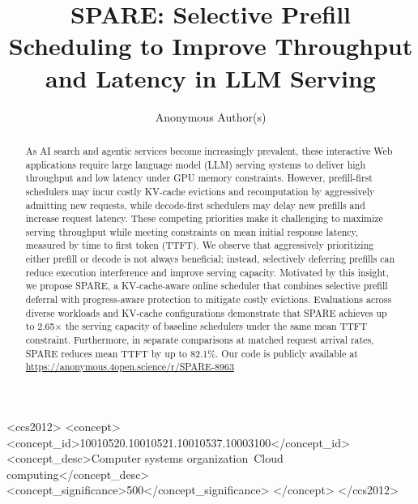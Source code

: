 \documentclass[sigconf,anonymous,review]{acmart}
\begin{document}
\title{SPARE: Selective Prefill Scheduling to Improve Throughput and Latency in LLM Serving}

\author{Anonymous Author(s)}

\begin{abstract}
As AI search and agentic services become increasingly prevalent, these interactive Web applications require large language model (LLM) serving systems to deliver high throughput and low latency under GPU memory constraints. However, prefill-first schedulers may incur costly KV-cache evictions and recomputation by aggressively admitting new requests, while decode-first schedulers may delay new prefills and increase request latency. These competing priorities make it challenging to maximize serving throughput while meeting constraints on mean initial response latency, measured by time to first token (TTFT). We observe that aggressively prioritizing either prefill or decode is not always beneficial; instead, selectively deferring prefills can reduce execution interference and improve serving capacity. Motivated by this insight, we propose SPARE, a KV-cache-aware online scheduler that combines selective prefill deferral with progress-aware protection to mitigate costly evictions. Evaluations across diverse workloads and KV-cache configurations demonstrate that SPARE achieves up to 2.65$\times$ the serving capacity of baseline schedulers under the same mean TTFT constraint. Furthermore, in separate comparisons at matched request arrival rates, SPARE reduces mean TTFT by up to 82.1\%. Our code is publicly available at \url{https://anonymous.4open.science/r/SPARE-8963}
\end{abstract}

\begin{CCSXML}
<ccs2012>
   <concept>
       <concept_id>10010520.10010521.10010537.10003100</concept_id>
       <concept_desc>Computer systems organization~Cloud computing</concept_desc>
       <concept_significance>500</concept_significance>
       </concept>
 </ccs2012>
\end{CCSXML}


\end{document}
